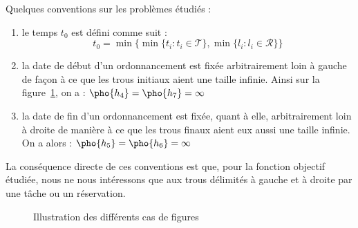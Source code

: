 \documentclass[a4paper,11pt]{thesis}
\begin{document}
\begin{nrmq}
    Quelques conventions sur les problèmes étudiés : \begin{enumerate}
        \item le temps $t_0$ est défini comme suit : \[
                t_0 = \min\{\min\{t_i : t_i \in \mathcal{T}\}, \min\{l_i : l_i \in \mathcal{R}\}\}
            \]
        \item la date de début d'un ordonnancement est fixée arbitrairement loin à gauche de façon à
            ce que les trous initiaux aient une taille infinie. Ainsi sur la figure~\ref{prescas},
            on a : $\pho{h_4} = \pho{h_7} = \infty$
        \item la date de fin d'un ordonnancement est fixée, quant à elle, arbitrairement loin à
            droite de manière à ce que les trous finaux aient eux aussi une taille infinie. On a
            alors : $\pho{h_5} = \pho{h_6} = \infty$
    \end{enumerate}

    La conséquence directe de ces conventions est que, pour la fonction objectif étudiée, nous ne
    nous intéressons que aux trous délimités à gauche et à droite par une tâche ou un réservation.
\end{nrmq}

\begin{figure}
    \begin{center}
        \begin{ordo}[8]{3}{1}{8}




        \end{ordo}
    \end{center}
    \caption{Illustration des différents cas de figures}
    \label{prescas}
\end{figure}


\end{document}
